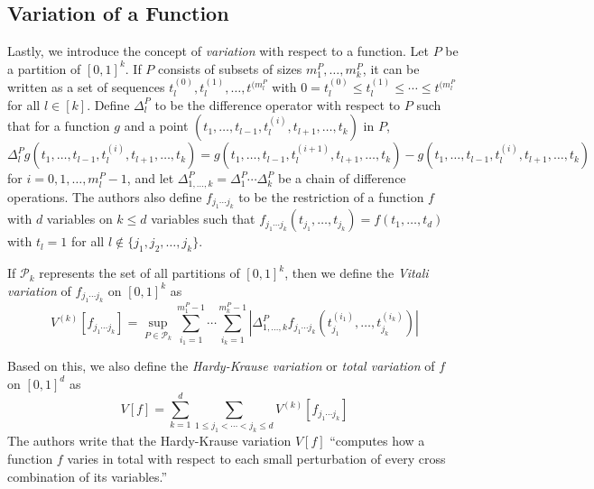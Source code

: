 \documentclass{article}
\begin{document}
\subsection{Variation of a Function}
Lastly, we introduce the concept of \textit{variation} with respect to a function. Let $P$ be a partition of $[0, 1]^k$. If $P$ consists of subsets of sizes $m^P_1, \ldots, m^P_k$, it can be written as a set of sequences $t^{(0)}_l, t^{(1)}_l, \ldots, t^{(m^P_l}$ with $0 = t^{(0)}_l \leq t^{(1)}_l \leq \cdots \leq t^{(m^P_l}$ for all $l \in [k]$. Define $\Delta^P_l$ to be the difference operator with respect to $P$ such that for a function $g$ and a point $(t_1, \ldots, t_{l-1}, t^{(i)}_l, t_{l+1}, \ldots, t_k)$ in $P$,
\[\Delta^P_l g(t_1, \ldots, t_{l-1}, t^{(i)}_l, t_{l+1}, \ldots, t_k) = g(t_1, \ldots, t_{l-1}, t^{(i+1)}_l, t_{l+1}, \ldots, t_k) - g(t_1, \ldots, t_{l-1}, t^{(i)}_l, t_{l+1}, \ldots, t_k)\]
for $i = 0, 1, \ldots, m^P_l - 1$, and let $\Delta^P_{1, \ldots, k} = \Delta^P_1 \cdots \Delta^P_k$ be a chain of difference operations. The authors also define $f_{j_1 \cdots j_k}$ to be the restriction of a function $f$ with $d$ variables on $k \leq d$ variables such that $f_{j_1 \cdots j_k} (t_{j_1}, \ldots, t_{j_k}) = f(t_1, \ldots, t_d)$ with $t_l = 1$ for all $l \notin \{j_1, j_2, \ldots, j_k\}$.

If $\mathcal{P}_k$ represents the set of all partitions of $[0, 1]^k$, then we define the \textit{Vitali variation} of $f_{j_1 \cdots j_k}$ on $[0, 1]^k$ as
\[V^{(k)}[f_{j_1 \cdots j_k}] = \sup_{P \in \mathcal{P}_k} \sum_{i_1 = 1}^{m^P_1 - 1} \cdots \sum_{i_k = 1}^{m^P_k - 1} \left| \Delta^P_{1, \ldots, k} f_{j_1 \cdots j_k} (t^{(i_1)}_{j_1}, \ldots, t^{(i_k)}_{j_k}) \right|\]

Based on this, we also define the \textit{Hardy-Krause variation} or \textit{total variation} of $f$ on $[0, 1]^d$ as
\[V[f] = \sum_{k=1}^{d} \sum_{1 \leq j_1 < \cdots < j_k \leq d} V^{(k)}[f_{j_1 \cdots j_k}]\]
The authors write that the Hardy-Krause variation $V[f]$ ``computes how a function $f$ varies in total with respect to each small perturbation of every cross combination of its variables.'' \cite{kawaguchi2018}
\end{document}
